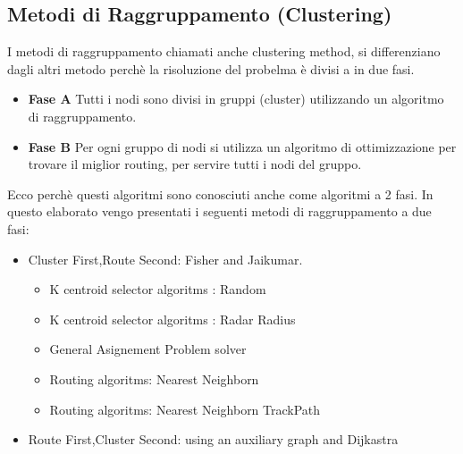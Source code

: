 \documentclass[]{article}
\begin{document}
\subsection{Metodi di Raggruppamento (Clustering)}
I metodi di raggruppamento chiamati anche clustering method, si differenziano dagli altri metodo perchè la risoluzione del probelma è divisi a in due fasi.
\begin{itemize}
\item \textbf{Fase A} Tutti i nodi sono divisi in gruppi (cluster) utilizzando un algoritmo di raggruppamento.
\item \textbf{Fase B} Per ogni gruppo di nodi si utilizza un algoritmo di ottimizzazione per trovare il miglior routing, per servire tutti i nodi del gruppo.
\end{itemize}
Ecco perchè questi algoritmi sono conosciuti anche come algoritmi a 2 fasi.
In questo elaborato vengo presentati i seguenti metodi di raggruppamento a due fasi:
\begin{itemize}
	\item Cluster First,Route Second: Fisher and Jaikumar.
		\begin{itemize}
			\item K centroid selector algoritms :  Random
			\item K centroid selector algoritms :  Radar Radius
			\item General Asignement Problem solver
			\item Routing algoritms: Nearest Neighborn
			\item Routing algoritms: Nearest Neighborn TrackPath		
		\end{itemize}
	\item Route First,Cluster Second: using an auxiliary graph and Dijkastra
\end{itemize}
\end{document}
